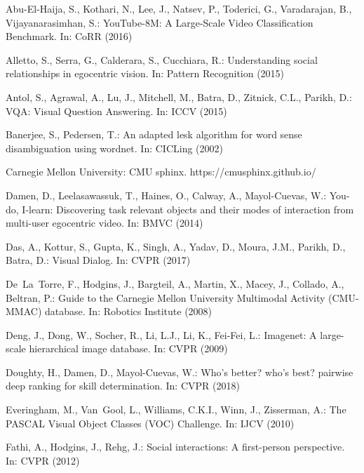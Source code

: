 \documentclass[runningheads]{llncs}
\begin{document}

\begin{thebibliography}{10}
\providecommand{\url}[1]{\texttt{#1}}
\providecommand{\urlprefix}{URL }
\providecommand{\doi}[1]{https://doi.org/#1}

Abu{-}El{-}Haija, S., Kothari, N., Lee, J., Natsev, P., Toderici, G.,
  Varadarajan, B., Vijayanarasimhan, S.: {YouTube-8M: {A} Large-Scale Video
  Classification Benchmark}. In: CoRR (2016)

Alletto, S., Serra, G., Calderara, S., Cucchiara, R.: Understanding social
  relationships in egocentric vision. In: {Pattern Recognition} (2015)

Antol, S., Agrawal, A., Lu, J., Mitchell, M., Batra, D., Zitnick, C.L., Parikh,
  D.: {VQA}: {V}isual {Q}uestion {A}nswering. In: ICCV (2015)

Banerjee, S., Pedersen, T.: An adapted lesk algorithm for word sense
  disambiguation using wordnet. In: {CICLing} (2002)

{Carnegie Mellon University}: {CMU} sphinx. https://cmusphinx.github.io/

Damen, D., Leelasawassuk, T., Haines, O., Calway, A., Mayol-Cuevas, W.: You-do,
  {I}-learn: Discovering task relevant objects and their modes of interaction
  from multi-user egocentric video. In: BMVC (2014)

Das, A., Kottur, S., Gupta, K., Singh, A., Yadav, D., Moura, J.M., Parikh, D.,
  Batra, D.: {V}isual {D}ialog. In: CVPR (2017)

De~La~Torre, F., Hodgins, J., Bargteil, A., Martin, X., Macey, J., Collado, A.,
  Beltran, P.: Guide to the {C}arnegie {M}ellon {U}niversity {M}ultimodal
  {A}ctivity ({CMU-MMAC}) database. In: Robotics Institute (2008)

Deng, J., Dong, W., Socher, R., Li, L.J., Li, K., Fei-Fei, L.: Imagenet: A
  large-scale hierarchical image database. In: CVPR (2009)

Doughty, H., Damen, D., Mayol-Cuevas, W.: Who's better? who's best? pairwise
  deep ranking for skill determination. In: CVPR (2018)

Everingham, M., Van~Gool, L., Williams, C.K.I., Winn, J., Zisserman, A.: The
  {PASCAL} {V}isual {O}bject {C}lasses {(VOC)} {C}hallenge. In: IJCV (2010)

Fathi, A., Hodgins, J., Rehg, J.: Social interactions: A first-person
  perspective. In: CVPR (2012)


\end{thebibliography}
\end{document}

